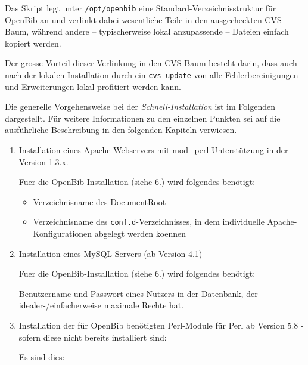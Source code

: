 \documentclass[11pt, twoside, a4paper, BCOR8mm, DIV12, bibtotoc,idxtotoc]{scrbook}
\begin{document}
Das Skript legt unter \texttt{/opt/openbib} eine
Standard-Verzeichnisstruktur für OpenBib an und verlinkt dabei
wesentliche Teile in den ausgecheckten CVS-Baum, während andere --
typischerweise lokal anzupassende -- Dateien einfach kopiert werden.

Der grosse Vorteil dieser Verlinkung in den CVS-Baum besteht darin,
dass auch nach der lokalen Installation durch ein \texttt{cvs update}
von alle Fehlerbereinigungen und Erweiterungen lokal profitiert werden
kann.
 
Die generelle Vorgehensweise bei der \emph{Schnell-Installation} ist
im Folgenden dargestellt. Für weitere Informationen zu den einzelnen
Punkten sei auf die ausführliche Beschreibung in den folgenden
Kapiteln verwiesen.

\begin{enumerate}
\item Installation eines Apache-Webservers mit mod\_perl-Unterstützung in
   der Version 1.3.x.

   Fuer die OpenBib-Installation (siehe 6.) wird folgendes benötigt:

   \begin{itemize}
   \item Verzeichnisname des DocumentRoot
   \item Verzeichnisname des \texttt{conf.d}-Verzeichnisses, in dem
     individuelle Apache-Konfigura\-tio\-nen abgelegt werden koennen
   \end{itemize}
\item Installation eines MySQL-Servers (ab Version 4.1)

   Fuer die OpenBib-Installation (siehe 6.) wird folgendes benötigt:

   Benutzername und Passwort eines Nutzers in der Datenbank, der
   idealer-/einfacherweise maximale Rechte hat. 

\item Installation der für OpenBib benötigten Perl-Module für Perl ab
   Version 5.8 - sofern diese nicht bereits installiert sind:

   Es sind dies:


\end{enumerate}
\end{document}
